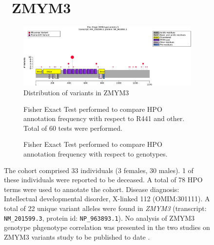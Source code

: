 \begin{figure}[htbp]
\section*{ ZMYM3}
\centering
\begin{subfigure}[b]{0.95\textwidth}
\centering
\includegraphics[width=\textwidth]{ img/ZMYM3_protein_diagram.pdf} 
\captionsetup{justification=raggedright,singlelinecheck=false}
\caption{Distribution of variants in ZMYM3}
\end{subfigure}
\vspace{2em}

\begin{subfigure}[b]{0.95\textwidth}
\centering
{}
\captionsetup{justification=raggedright,singlelinecheck=false}
\caption{Fisher Exact Test performed to compare HPO annotation frequency with respect to R441 and other. Total of 60 tests were performed. }
\end{subfigure}
\vspace{2em}
\begin{subfigure}[b]{0.95\textwidth}
\centering
{}
\captionsetup{justification=raggedright,singlelinecheck=false}
\caption{Fisher Exact Test performed to compare HPO annotation frequency with respect to genotypes. }
\end{subfigure}

\vspace{2em}

\caption{ The cohort comprised 33 individuals (3 females, 30 males). 1 of these individuals were reported to be deceased. A total of 78 HPO terms were used to annotate the cohort. Disease diagnosis: Intellectual developmental disorder, X-linked 112 (OMIM:301111).  A total of 22 unique variant alleles were found in \textit{ZMYM3} (transcript: \texttt{NM\_201599.3}, protein id: \texttt{NP\_963893.1}). No analysis of ZMYM3 genotype phgenotype correlation was presented in the two studies on ZMYM3 variants study to be published to date \cite{PMID_24721225,PMID_36586412}.}
\end{figure}
